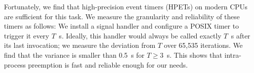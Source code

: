 Fortunately, we find that high-precision event timers (HPETs) on modern CPUs
are sufficient for this task. We measure the granularity and reliability of
these timers as follows: We install a signal handler and configure a POSIX timer to
trigger it every $T$~\textmu{}s.
Ideally, this handler would always be called exactly $T$~\textmu{}s after its last
invocation; we measure the deviation from $T$ over 65,535 iterations.
We find that the variance
is smaller than 0.5~\textmu{}s for $T \ge 3$~\textmu{}s. This shows that
intra-process preemption is fast and reliable enough for our needs.
